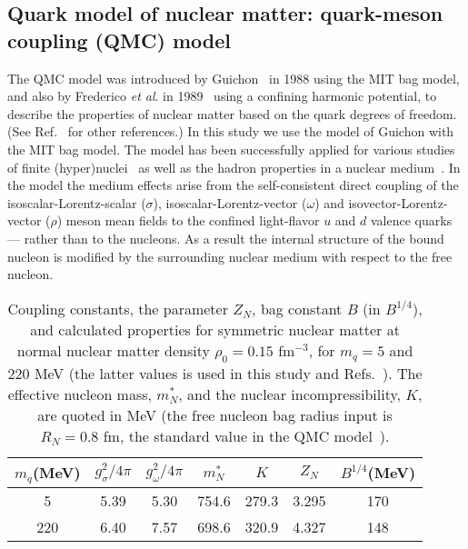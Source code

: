 \documentclass[preprint,aps,showpacs,floatfix]{revtex4}
\begin{document}
\subsection{Quark model of nuclear matter: quark-meson coupling (QMC) model}
\label{QMC}

The QMC model was introduced by Guichon~\cite{Guichon} in 1988  
using the MIT bag model, and also by Frederico {\it et al\/}. 
in 1989~\cite{Frederico} using a confining harmonic potential,
to describe the properties of nuclear matter based on the quark degrees of freedom. 
(See Ref.~\cite{QMCreview} for other references.) 
In this study we use the model of Guichon with the MIT bag model. 
The model has been successfully applied for various studies of finite
(hyper)nuclei~\cite{QMCfinite} as well as the hadron properties 
in a nuclear medium~\cite{QMCreview}.
In the model the medium effects arise from the self-consistent direct coupling of
the isoscalar-Lorentz-scalar ($\sigma$), isoscalar-Lorentz-vector ($\omega$) 
and isovector-Lorentz-vector ($\rho$) meson mean fields  
to the confined light-flavor $u$ and $d$ valence quarks --- rather than to the nucleons.
As a result the internal structure of the bound nucleon is modified by the
surrounding nuclear medium with respect to the free nucleon.


\begin{table}[tb]
\begin{center}
\caption{Coupling constants, the parameter $Z_N$, bag constant $B$ (in $B^{1/4}$),
and calculated properties for symmetric nuclear matter
at normal nuclear matter density $\rho_0 = 0.15$ fm$^{-3}$,
for $m_q = 5$ and $220$ MeV (the latter values is used in this study and Refs.~\cite{pimedium1,pimedium2,pimedium3,pimedium4}). 
The effective nucleon mass, $m_N^*$, and the nuclear
incompressibility, $K$, are quoted in MeV (the free nucleon bag radius input is $R_N = 0.8$ fm,
the standard value in the QMC model~\cite{QMCreview}). }
\label{Tab:QMC}
\bigskip
\begin{tabular}{c|cccccc}
\hline
$m_q$(MeV)&$g_{\sigma}^2/4\pi$&$g_{\omega}^2/4\pi$
&$m_N^*$ &$K$ & $Z_N$ & $B^{1/4}$(MeV)\\
\hline
 5   &5.39 &5.30 &754.6 &279.3 &3.295 &170 \\
 220 &6.40 &7.57 &698.6 &320.9 &4.327 &148 \\
\hline
\end{tabular}
\end{center}
\end{table}
\end{document}
